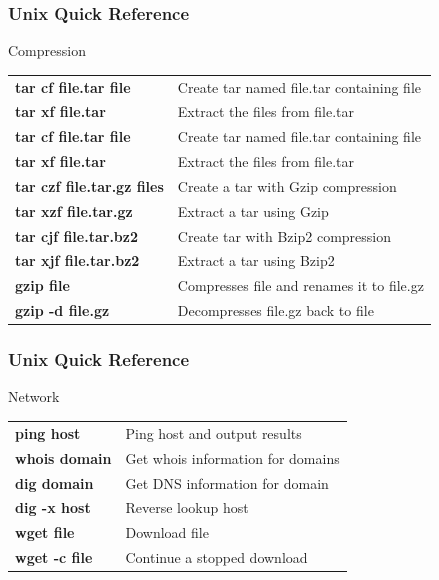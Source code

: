\documentclass[10pt, hyperref={unicode=true,pdfusetitle, bookmarks=true,bookmarksnumbered=false,bookmarksopen=false, breaklinks=false,pdfborder={0 0 1},backref=true,colorlinks=true,linkcolor=darkblue,pageanchor}]{beamer}
\begin{document}
\begin{frame}
\frametitle{Unix Quick Reference}

\begin{block}{Compression}
\begin{tabular}{ll}
\textbf{tar cf file.tar file}           & Create tar named file.tar containing file     \tabularnewline
\textbf{tar xf file.tar}                & Extract the files from file.tar               \tabularnewline
\textbf{tar cf file.tar file}           & Create tar named file.tar containing file     \tabularnewline
\textbf{tar xf file.tar}                & Extract the files from file.tar               \tabularnewline
\textbf{tar czf file.tar.gz files}      & Create a tar with Gzip compression            \tabularnewline
\textbf{tar xzf file.tar.gz}            & Extract a tar using Gzip                      \tabularnewline
\textbf{tar cjf file.tar.bz2}           & Create tar with Bzip2 compression             \tabularnewline
\textbf{tar xjf file.tar.bz2}           & Extract a tar using Bzip2                     \tabularnewline
\textbf{gzip file}                      & Compresses file and renames it to file.gz     \tabularnewline
\textbf{gzip -d file.gz}                & Decompresses file.gz back to file             \tabularnewline
\end{tabular}
\end{block}

\end{frame}
\begin{frame}
\frametitle{Unix Quick Reference}
\begin{block}{Network}

\begin{tabular}{ll}
\textbf{ping host}      & Ping host and output results                  \tabularnewline
\textbf{whois domain}   & Get whois information for domains             \tabularnewline
\textbf{dig domain}     & Get DNS information for domain                \tabularnewline
\textbf{dig -x host}    & Reverse lookup host                           \tabularnewline
\textbf{wget file}      & Download file                                 \tabularnewline
\textbf{wget -c file}   & Continue a stopped download                   \tabularnewline
\end{tabular}

\end{block}
\end{frame}
\end{document}
